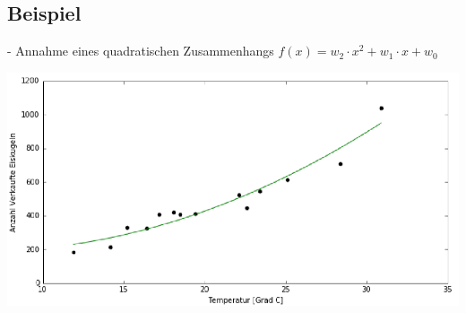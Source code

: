 \documentclass{report}
\begin{document}
  \subsection{Beispiel}	
  - Annahme eines quadratischen Zusammenhangs $f(x) = w_2\cdot x^2 + w_1\cdot x + w_0$	
  \begin{center}	
    \includegraphics[scale=.295]{ml02_6}	
  \end{center}	
  
\end{document}
